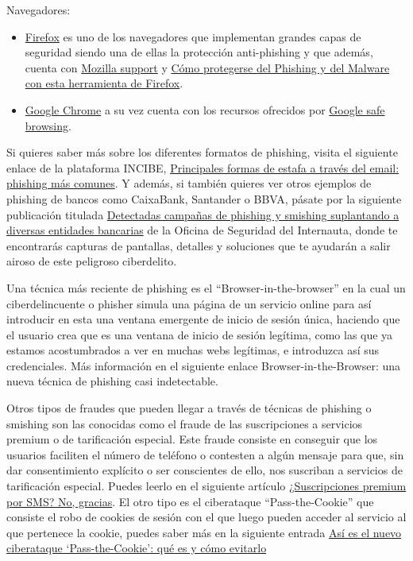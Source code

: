\documentclass[
  spanish,
  a4paper,
  openany]{book}
\begin{document}
Navegadores:

\begin{itemize}
\item
  \href{https://www.mozilla.org/es-ES/firefox/}{Firefox} es uno de los navegadores que implementan grandes capas de seguridad siendo una de ellas la protección anti-phishing y que además, cuenta con \href{https://support.mozilla.org/es/}{Mozilla support} y \href{https://support.mozilla.org/es/kb/como-protegerse-del-phishing-y-del-malware-con-esta-herramienta-firefox}{Cómo protegerse del Phishing y del Malware con esta herramienta de Firefox}.
\item
  \href{https://www.google.com/intl/es/chrome/}{Google Chrome} a su vez cuenta con los recursos ofrecidos por \href{https://safebrowsing.google.com/}{Google safe browsing}.
\end{itemize}

Si quieres saber más sobre los diferentes formatos de phishing, visita el siguiente enlace de la plataforma INCIBE, \href{https://www.incibe.es/empresas/blog/principales-formas-de-estafa-traves-del-email-phishing-mas-comunes}{Principales formas de estafa a través del email: phishing más comunes}. Y además, si también quieres ver otros ejemplos de phishing de bancos como CaixaBank, Santander o BBVA, pásate por la siguiente publicación titulada \href{https://www.incibe.es/ciudadania/avisos/detectadas-campanas-de-phishing-y-smishing-suplantando-diversas-entidades}{Detectadas campañas de phishing y smishing suplantando a diversas entidades bancarias} de la Oficina de Seguridad del Internauta, donde te encontrarás capturas de pantallas, detalles y soluciones que te ayudarán a salir airoso de este peligroso ciberdelito.

Una técnica más reciente de phishing es el ``Browser-in-the-browser'' en la cual un ciberdelincuente o phisher simula una página de un servicio online para así introducir en esta una ventana emergente de inicio de sesión única, haciendo que el usuario crea que es una ventana de inicio de sesión legítima, como las que ya estamos acostumbrados a ver en muchas webs legítimas, e introduzca así sus credenciales. Más información en el siguiente enlace Browser-in-the-Browser: una nueva técnica de phishing casi indetectable.

Otros tipos de fraudes que pueden llegar a través de técnicas de phishing o smishing son las conocidas como el fraude de las suscripciones a servicios premium o de tarificación especial. Este fraude consiste en conseguir que los usuarios faciliten el número de teléfono o contesten a algún mensaje para que, sin dar consentimiento explícito o ser conscientes de ello, nos suscriban a servicios de tarificación especial. Puedes leerlo en el siguiente artículo \href{https://www.incibe.es/ciudadania/blog/suscripciones-premium-por-sms-no-gracias}{¿Suscripciones premium por SMS? No, gracias}. El otro tipo es el ciberataque ``Pass-the-Cookie'' que consiste el robo de cookies de sesión con el que luego pueden acceder al servicio al que pertenece la cookie, puedes saber más en la siguiente entrada \href{https://www.20minutos.es/tecnologia/ciberseguridad/ciberataque-pass-the-cookie-que-es-como-evitarlo-5163208/}{Así es el nuevo ciberataque `Pass-the-Cookie': qué es y cómo evitarlo}
\end{document}

